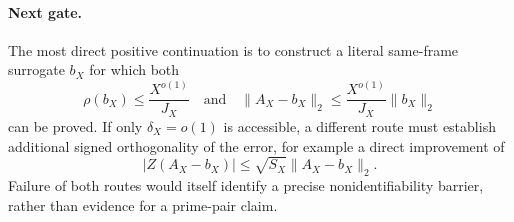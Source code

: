 \paragraph{Next gate.}
The most direct positive continuation is to construct a literal
same-frame surrogate \(b_X\) for which both
\[
 \rho(b_X)\le\frac{X^{o(1)}}{J_X}
\quad\text{and}\quad
 \|A_X-b_X\|_2
 \le\frac{X^{o(1)}}{J_X}\|b_X\|_2
\]
can be proved.  If only \(\delta_X=o(1)\) is accessible, a different
route must establish additional signed orthogonality of the error,
for example a direct improvement of
\[
 |Z(A_X-b_X)|
 \le\sqrt{S_X}\|A_X-b_X\|_2.
\]
Failure of both routes would itself identify a precise
nonidentifiability barrier, rather than evidence for a prime-pair
claim.
